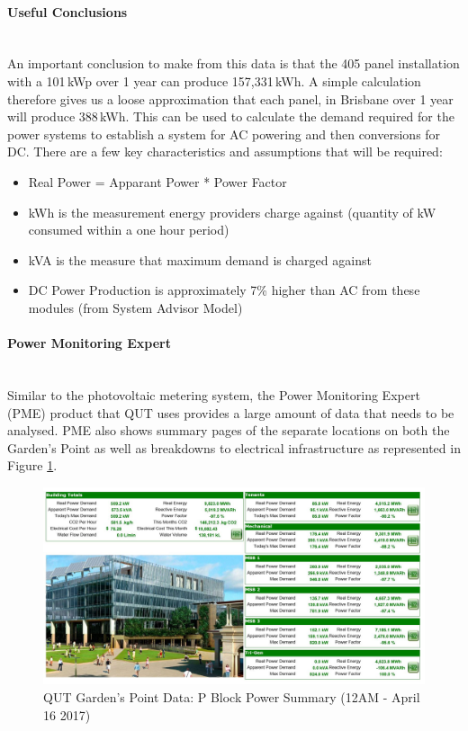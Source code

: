 \paragraph{Useful Conclusions}
~\\
An important conclusion to make from this data is that the 405 panel installation with a 101\,kWp over 1 year can produce 157,331\,kWh. A simple calculation therefore gives us a loose approximation that each panel, in Brisbane over 1 year will produce 388\,kWh. This can be used to calculate the demand required for the power systems to establish a system for AC powering and then conversions for DC. There are a few key characteristics and assumptions that will be required:
\newline
\begin{itemize}[noitemsep,nolistsep]
	\item Real Power = Apparant Power * Power Factor
	\item kWh is the measurement energy providers charge against (quantity of kW consumed within a one hour period)
	\item kVA is the measure that maximum demand is charged against
	\item DC Power Production is approximately 7\% higher than AC from these modules (from System Advisor Model)
\end{itemize} 

\newpage

\paragraph{Power Monitoring Expert}
~~\\
Similar to the photovoltaic metering system, the Power Monitoring Expert (PME) product that QUT uses provides a large amount of data that needs to be analysed. PME also shows summary pages of the separate locations on both the Garden's Point as well as breakdowns to electrical infrastructure as represented in Figure \ref{fig:qut-pme-pblock-summary}. 

\begin{figure}[H]
	\hfill\includegraphics[width = 150mm]{images/metering/pme/pme-p-block-summary-page}\hspace*{\fill}
	\caption{QUT Garden's Point Data: P Block Power Summary (12AM - April 16 2017)} 
	\label{fig:qut-pme-pblock-summary}
\end{figure} 

